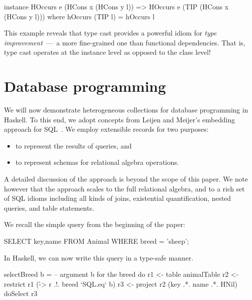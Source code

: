 \documentclass[nocopyrightspace,preprint]{sigplan-proc}
\begin{document}
\begin{code}
instance HOccurs e (HCons x (HCons y l))
      => HOccurs e (TIP (HCons x (HCons y l)))
 where hOccurs (TIP l) = hOccurs l
\end{code}

This example reveals that type cast provides a powerful idiom for
\emph{type improvement}~---~a more fine-grained one than functional
dependencies. That is, type cast operates at the instance level as
opposed to the class level!






\section{Database programming}
\label{S:db}

We will now demonstrate heterogeneous collections for database
programming in Haskell. To this end, we adopt concepts from Leijen and
Meijer's embedding approach for SQL~\cite{LM99}. We employ extensible
records for two purposes:
%
\begin{itemize}
\item to represent the results of queries, and
\item to represent schemas for relational algebra operations.
\end{itemize}
%
A detailed discussion of the approach is beyond the scope of this
paper. We note however that the approach scales to the full relational
algebra, and to a rich set of SQL idioms including all kinds of joins,
existential quantification, nested queries, and table statements.

We recall the simple query from the beginning of the paper:

\begin{code}
 SELECT key,name FROM Animal WHERE breed = 'sheep';
\end{code}

In Haskell, we can now write this query in a type-safe manner.

\begin{code}
 selectBreed b = -- argument b for the breed
  do r1 <- table animalTable
     r2 <- restrict r1 (\r -> r .!. breed `SQL.eq` b)
     r3 <- project r2 (key .*. name .*. HNil)
     doSelect r3
\end{code}
\end{document}
